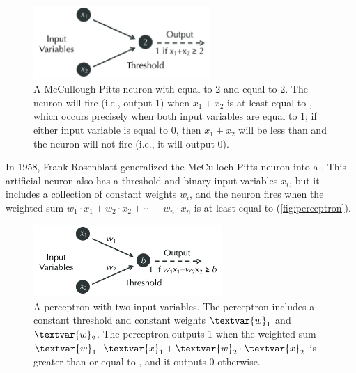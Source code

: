 \begin{figure}[h]
\centering
\mySfFamily
\includegraphics[width = 0.6\textwidth]{../images_CMYK/MP_neuron}
\caption{A McCullough-Pitts neuron with  equal to 2 and  equal to 2. The neuron will fire (i.e., output 1) when $x_1 + x_2$ is at least equal to , which occurs precisely when both input variables are equal to 1; if either input variable is equal to 0, then $x_1 + x_2$ will be less than  and the neuron will not fire (i.e., it will output 0).}
\label{fig:MP_neuron}
\end{figure}

In 1958, Frank Rosenblatt generalized the McCulloch-Pitts neuron into a . This artificial neuron also has a threshold  and  binary input variables $x_i$, but it includes a collection of constant weights $w_i$, and the neuron fires when the weighted sum $w_1 \cdot x_1 + w_2 \cdot x_2 + \cdots + w_n \cdot x_n$ is at least equal to  (\autoref{fig:perceptron}).\\

\begin{note}\end{note}

\begin{figure}[h]
\centering
\mySfFamily
\includegraphics[width = 0.64\textwidth]{../images_CMYK/perceptron}
\caption{A perceptron with two input variables. The perceptron includes a constant threshold and constant weights $\textvar{w}_\text{1}$ and $\textvar{w}_\text{2}$. The perceptron outputs 1 when the weighted sum $\textvar{w}_\text{1} \cdot \textvar{x}_\text{1} + \textvar{w}_\text{2} \cdot \textvar{x}_\text{2}$ is greater than or equal to , and it outputs 0 otherwise.}
\label{fig:perceptron}
\end{figure}


